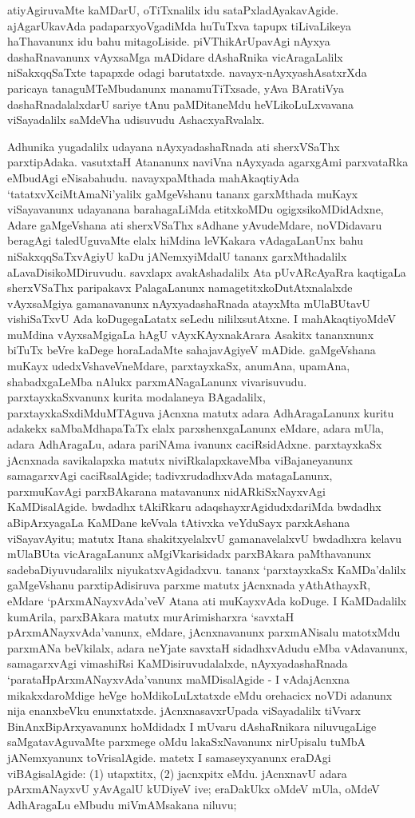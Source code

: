 atiyAgiruvaMte kaMDarU, oTiTxnalilx idu sataPxladAyakavAgide. ajAgarUkavAda padaparxyoVgadiMda huTuTxva tapupx tiLivaLikeya haThavanunx idu bahu mitagoLiside. piVThikArUpavAgi nAyxya dashaRnavanunx vAyxsaMga mADidare dAshaRnika vicAragaLalilx niSakxqqSaTxte tapapxde odagi barutatxde. navayx-nAyxyashAsatxrXda paricaya tanaguMTeMbudanunx manamuTiTxsade, yAva BAratiVya dashaRnadalalxdarU sariye tAnu paMDitaneMdu heVLikoLuLxvavana viSayadalilx saMdeVha udisuvudu AshacxyaRvalalx.

Adhunika yugadalilx udayana nAyxyadashaRnada ati sherxVSaThx parxtipAdaka. \hbox{vasutxtaH} Atananunx naviVna nAyxyada agarxgAmi parxvataRka eMbudAgi eNisabahudu. navayx\-paMthada mahAkaqtiyAda `tatatxvXciMtAmaNi'yalilx gaMgeVshanu tananx garxMthada muKayx viSaya\-vanunx udayanana barahagaLiMda etitxkoMDu ogigxsikoMDidAdxne, Adare gaMgeVshana ati sherxVSaThx sAdhane yAvudeMdare, noVDidavaru beragAgi taledUguvaMte elalx hiMdina leVKa\-kara vAdagaLanUnx bahu niSakxqqSaTxvAgiyU kaDu jANemxyiMdalU tananx garxMthadalilx aLa\-vaDisikoMDiruvudu. savxlapx avakAshadalilx Ata pUvARcAyaRra kaqtigaLa sherxVSaThx paripakavx PalagaLanunx namagetitxkoDutAtxnalalxde vAyxsaMgiya gamanavanunx nAyxyadashaRnada atayxMta mUlaBUtavU vishiSaTxvU Ada koDugegaLatatx seLedu nililxsutAtxne. I mahAkaqti\-yoMdeV muMdina vAyxsaMgigaLa hAgU vAyxKAyxnakArara Asakitx tananxnunx biTuTx beVre kaDege horaLa\-daMte sahajavAgiyeV mADide. gaMgeVshana muKayx udedxVshaveVneMdare, parxtayxkaSx, anu\-mAna, upamAna, shabadxgaLeMba nAlukx parxmANagaLanunx vivarisuvudu. parxtayxkaSxvanunx kurita modalaneya BAgadalilx, parxtayxkaSxdiMduMTAguva jAcnxna matutx adara AdhAragaLanunx kuritu adakekx saMbaMdhapaTaTx elalx parxshenxgaLanunx eMdare, adara mUla, adara AdhAragaLu, adara pariNAma ivanunx caciRsidAdxne. parxtayxkaSx jAcnxnada savikalapxka matutx niviRkalapxkaveMba viBajaneyanunx samagarxvAgi caciRsalAgide; tadivxrudadhxvAda matagaLanunx, parxmuKavAgi parxBAkarana matavanunx nidARkiSxNayxvAgi KaMDisalAgide. bwdadhx tAkiRkaru adaqshayxrAgidudxdariMda bwdadhx aBipArxyagaLa KaMDane keVvala tAtivxka veYduSayx parxkAshana viSaya\-vAyitu; matutx Itana shakitxyelalxvU gamanavelalxvU bwdadhxra kelavu mUlaBUta vicAragaLanunx aMgiVkarisidadx parxBAkara paMthavanunx sadebaDiyuvudaralilx niyukatxvAgidadxvu. tananx `parxtayxkaSx KaMDa'dalilx gaMgeVshanu parxtipAdisiruva parxme matutx jAcnxnada yAthAthayxR, eMdare `pArxmANayxvAda'veV Atana ati muKayxvAda koDuge. I KaMDadalilx kumA\-rila, parxBAkara matutx murArimisharxra `savxtaH pArxmANayxvAda'vanunx, eMdare, jAcnxnavanunx parxmANisalu matotxMdu parxmANa beVkilalx, adara neYjate savxtaH sidadhxvAdudu eMba vAdavanunx, samagarxvAgi vimashiRsi KaMDisiruvudalalxde, nAyxyadashaRnada `parataH\-pArxmANayxvAda'vanunx maMDisalAgide - I vAdajAcnxna mikakxdaroMdige heVge hoMdi\-koLuLxtatxde eMdu orehacicx noVDi adanunx nija enanxbeVku enunxtatxde. jAcnxnasavxrUpada viSayadalilx tiVvarx BinAnxBipArxyavanunx hoMdidadx I mUvaru dAshaRnikara niluvu\-gaLige saMgatavAguvaMte parxmege oMdu lakaSxNavanunx nirUpisalu tuMbA jANemxyanunx toVrisalAgide. matetx I samaseyxyanunx eraDAgi viBAgisalAgide: (1) utapxtitx, (2) jacnxpitx eMdu. jAcnxnavU adara pArxmANayxvU yAvAgalU kUDiyeV ive; eraDakUkx oMdeV mUla, oMdeV AdhAragaLu eMbudu miVmAMsakana niluvu; 